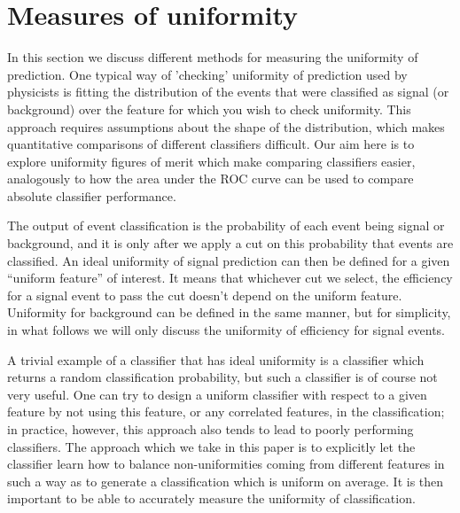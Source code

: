 \section{Measures of uniformity}
In this section we discuss different methods for measuring the uniformity of prediction. 
One typical way of 'checking' uniformity of prediction used by physicists 
is fitting the distribution of the events that were classified as signal (or background) over the 
feature for which you wish to check uniformity.
This approach requires assumptions about the shape of the distribution,
which makes quantitative comparisons of different classifiers difficult.
Our aim here is to explore uniformity figures of merit which make comparing classifiers easier,
analogously to how the area under the ROC curve can be used to compare absolute classifier performance.

The output of event classification is the probability of each event being signal or background,
and it is only after we apply a cut on this probability that events are classified.
An ideal uniformity of signal prediction can then be defined for a given ``uniform feature'' of interest.
It means that whichever cut we select,
the efficiency for a signal event to pass the cut doesn't depend on the uniform feature.
Uniformity for background can be defined in the same manner, but for simplicity,
in what follows we will only discuss the uniformity of efficiency for signal events.

A trivial example of a classifier that has ideal uniformity is a classifier which returns a random classification probability,
but such a classifier is of course not very useful. One can try to design a uniform classifier with respect to
a given feature by not using this feature, or any correlated features, in the classification; in practice, however,
this approach also tends to lead to poorly performing classifiers. The approach which we take in this paper is 
to explicitly let the classifier learn how to balance non-uniformities coming from different features in such a way
as to generate a classification which is uniform on average. It is then important to be able to accurately measure
the uniformity of classification. 

